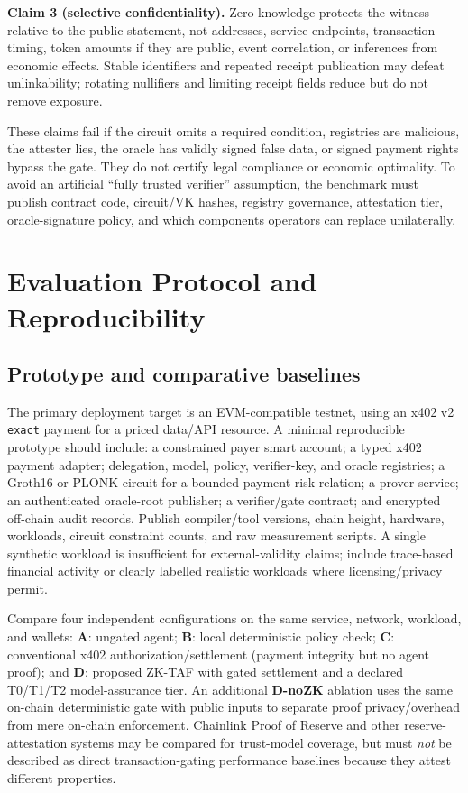 \documentclass[conference]{IEEEtran}
\newcommand{\zktaf}{\textsc{ZK-TAF}}
\begin{document}
\textbf{Claim 3 (selective confidentiality).} Zero knowledge protects the witness relative to the public statement, not addresses, service endpoints, transaction timing, token amounts if they are public, event correlation, or inferences from economic effects. Stable identifiers and repeated receipt publication may defeat unlinkability; rotating nullifiers and limiting receipt fields reduce but do not remove exposure.

These claims fail if the circuit omits a required condition, registries are malicious, the attester lies, the oracle has validly signed false data, or signed payment rights bypass the gate. They do not certify legal compliance or economic optimality. To avoid an artificial ``fully trusted verifier'' assumption, the benchmark must publish contract code, circuit/VK hashes, registry governance, attestation tier, oracle-signature policy, and which components operators can replace unilaterally.

\section{Evaluation Protocol and Reproducibility}
\subsection{Prototype and comparative baselines}
The primary deployment target is an EVM-compatible testnet, using an x402 v2 \texttt{exact} payment for a priced data/API resource. A minimal reproducible prototype should include: a constrained payer smart account; a typed x402 payment adapter; delegation, model, policy, verifier-key, and oracle registries; a Groth16 or PLONK circuit for a bounded payment-risk relation; a prover service; an authenticated oracle-root publisher; a verifier/gate contract; and encrypted off-chain audit records. Publish compiler/tool versions, chain height, hardware, workloads, circuit constraint counts, and raw measurement scripts. A single synthetic workload is insufficient for external-validity claims; include trace-based financial activity or clearly labelled realistic workloads where licensing/privacy permit.

Compare four independent configurations on the same service, network, workload, and wallets: \textbf{A}: ungated agent; \textbf{B}: local deterministic policy check; \textbf{C}: conventional x402 authorization/settlement (payment integrity but no agent proof); and \textbf{D}: proposed \zktaf{} with gated settlement and a declared T0/T1/T2 model-assurance tier. An additional \textbf{D-noZK} ablation uses the same on-chain deterministic gate with public inputs to separate proof privacy/overhead from mere on-chain enforcement. Chainlink Proof of Reserve and other reserve-attestation systems may be compared for trust-model coverage, but must \emph{not} be described as direct transaction-gating performance baselines because they attest different properties.
\end{document}
